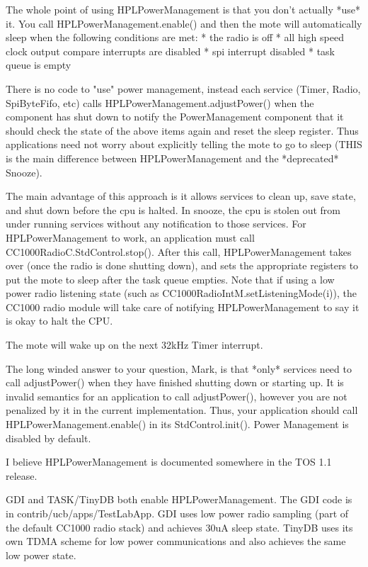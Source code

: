 

The whole point of using HPLPowerManagement is that you don't actually *use*
it.  You call HPLPowerManagement.enable() and then the mote will
automatically sleep when the following conditions are met:
  * the radio is off
  * all high speed clock output compare interrupts are disabled
  * spi interrupt disabled
  * task queue is empty

There is no code to "use" power management, instead each service (Timer,
Radio, SpiByteFifo, etc) calls HPLPowerManagement.adjustPower() when the
component has shut down to notify the PowerManagement component that it
should check the state of the above items again and reset the sleep
register.  Thus applications need not worry about explicitly telling the
mote to go to sleep (THIS is the main difference between HPLPowerManagement
and the *deprecated* Snooze).

The main advantage of this approach is it allows services to clean up, save
state, and shut down before the cpu is halted.  In snooze, the cpu is stolen
out from under running services without any notification to those services.
For HPLPowerManagement to work, an application must call
CC1000RadioC.StdControl.stop().  After this call, HPLPowerManagement takes
over (once the radio is done shutting down), and sets the appropriate
registers to put the mote to sleep after the task queue empties.  Note that
if using a low power radio listening state (such as
CC1000RadioIntM.setListeningMode(i)), the CC1000 radio module will take care
of notifying HPLPowerManagement to say it is okay to halt the CPU.

The mote will wake up on the next 32kHz Timer interrupt.

The long winded answer to your question, Mark, is that *only* services need
to call adjustPower() when they have finished shutting down or starting up.
It is invalid semantics for an application to call adjustPower(), however
you are not penalized by it in the current implementation.  Thus, your
application should call HPLPowerManagement.enable() in its
StdControl.init().  Power Management is disabled by default.

I believe HPLPowerManagement is documented somewhere in the TOS 1.1 release.

GDI and TASK/TinyDB both enable HPLPowerManagement.  The GDI code is in
contrib/ucb/apps/TestLabApp.  GDI uses low power radio sampling (part of the
default CC1000 radio stack) and achieves 30uA sleep state.  TinyDB uses its
own TDMA scheme for low power communications and also achieves the same low
power state.